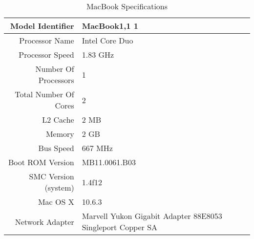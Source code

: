   \begin{table}[tbp]
    \begin{tabular}{| r | p{5cm} |}
      \hline
      Model Identifier      & MacBook1,1 1 \\ \hline
      Processor Name        & Intel Core Duo \\ \hline
      Processor Speed       & 1.83 GHz \\ \hline
      Number Of Processors  & 1 \\ \hline
      Total Number Of Cores & 2 \\ \hline
      L2 Cache              & 2 MB \\ \hline
      Memory                & 2 GB \\ \hline
      Bus Speed             & 667 MHz \\ \hline
      Boot ROM Version      & MB11.0061.B03 \\ \hline
      SMC Version (system)  & 1.4f12 \\ \hline
      Mac OS X              & 10.6.3 \\ \hline
      Network  Adapter      & Marvell Yukon Gigabit Adapter 88E8053 Singleport
      Copper SA \\
      \hline
    \end{tabular}
    \caption{MacBook Specifications}
    \label{macbookSpecs}
  \end{table}